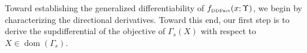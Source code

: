 \documentclass[smallextended]{svjour3hack}       %
\makeatletter
\newtheorem{lem}[thm]{Lemma}{\bf}{\rm}
\DeclareMathOperator{\ldet}{ldet}
\DeclareMathOperator{\Trace}{tr}
\DeclareMathOperator{\dom}{dom}
\renewcommand*{\top}{%
  {\mathpalette\@transpose{}}%
}
\newcommand*{\@transpose}[2]{%
  \raisebox{\depth}{$\m@th#1\mathsf{T}$}%
}
\makeatother
\begin{document}




Toward establishing the generalized differentiability of $f_{{\tiny\mbox{DDFact}}}(x;\Upsilon)$, we begin by characterizing the directional derivatives. Toward this end, our first step is to derive the supdifferential of the objective of $\Gamma_s(X)$ with respect to $X\in \dom(\Gamma_s)$.
\end{document}
